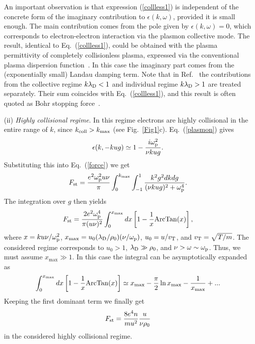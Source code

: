 \documentclass[twocolumn, 
  aps, prl,
  amsmath,amssymb,
  ]{revtex4-1}
\begin{document}
An important observation is that expression (\ref{collless1}) is independent of the concrete form of the imaginary contribution to $\epsilon(k,\omega)$, provided it is small enough. The main contribution comes from the pole given by  $\epsilon(k,\omega)=0$, which corresponds to electron-electron interaction via the plasmon collective mode. The result, identical to Eq.~(\ref{collless1}), could be obtained with the plasma permittivity of completely collisionless plasma, expressed via the conventional plasma dispersion function~\cite{PeterPRA1991}. In this case the imaginary part comes from the (exponentially small) Landau damping term. Note that in Ref.~\cite{PeterPRA1991} the contributions from the collective regime $k\lambda_{\rm D}<1$ and individual regime $k\lambda_{\rm D}>1$ are treated separately. Their sum coincides with Eq.~(\ref{collless1}), and this result is often quoted as Bohr stopping force~\cite{PeterPRA1991}. 
  
(ii) {\it Highly collisional regime}. In this regime electrons are highly collisional in the entire range of $k$, since $k_{\rm coll}>k_{\rm max}$ (see Fig.~\ref{Fig1}c). Eq.~(\ref{plasmon}) gives
\begin{displaymath}
\epsilon(k,-kug)\simeq 1-\frac{i \omega_{\rm p}^2}{\nu kug}.
\end{displaymath}    
Substituting this into Eq.~(\ref{force}) we get
\begin{equation}\label{collisional1}
F_{\rm st}=\frac{e^2\omega_{\rm p}^2u\nu}{\pi}\int_0^{k_{\max}}\int_{-1}^{1}\frac{k^2g^2 dk dg}{(\nu kug)^2+\omega_{\rm p}^4}.
\end{equation}
The integration over $g$ then yields
\begin{equation}\label{collisional2}
F_{\rm st}=\frac{2e^2\omega_{\rm p}^4}{\pi(u\nu)^2}\int_0^{x_{\max}}dx\left[1-\frac{1}{x}{\rm ArcTan}(x)\right],
\end{equation}
where $x= ku\nu/\omega_{\rm p}^2$, $x_{\rm max}=u_0(\lambda_{\rm D}/\rho_0)(\nu/\omega_{\rm p})$, $u_0=u/v_{\rm T}$, and $v_{\rm T}=\sqrt{T/m}$. The considered regime corresponds to $u_0>1$, $\lambda_{\rm D}\gg \rho_0$, and $\nu> \omega \sim \omega_{\rm p}$. Thus, we must assume $x_{\max}\gg 1$. In this case the integral can be asymptotically expanded as
\begin{displaymath}
\int_0^{x_{\max}}dx\left[1-\frac{1}{x}{\rm ArcTan}(x)\right]\simeq x_{\max}-\frac{\pi}{2}\ln x_{\max}-\frac{1}{x_{\max}}+...
\end{displaymath}  
Keeping the first dominant term we finally get
\begin{equation}\label{collisional3}
F_{\rm st} = \frac{8e^4n}{mu^2}\frac{u}{\nu\rho_0}
\end{equation}  
in the considered highly collisional regime. 
\end{document}
